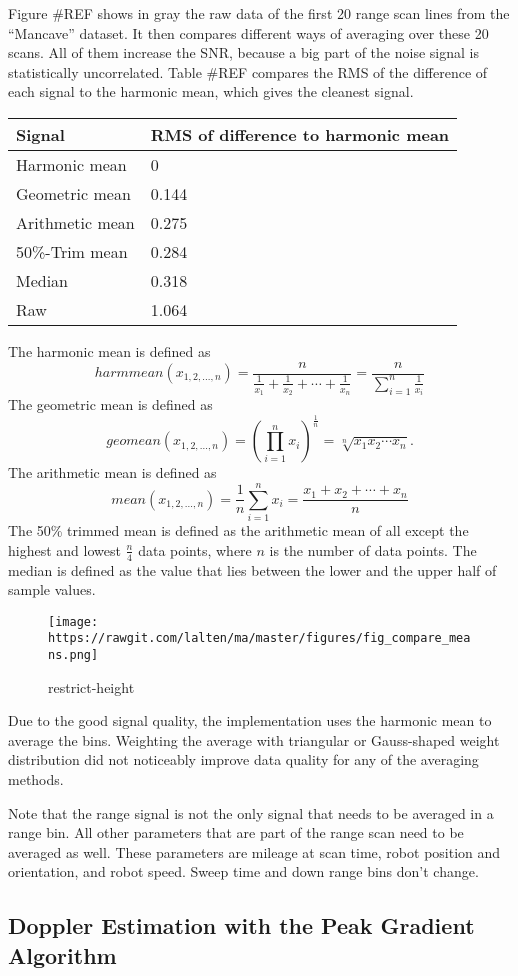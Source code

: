 Figure \#REF shows in gray the raw data of the first 20 range scan lines
from the ``Mancave'' dataset. It then compares different ways of
averaging over these 20 scans. All of them increase the SNR, because a
big part of the noise signal is statistically uncorrelated. Table \#REF
compares the RMS of the difference of each signal to the harmonic mean,
which gives the cleanest signal.

\begin{longtable}[]{@{}ll@{}}
\toprule
Signal & RMS of difference to harmonic mean\tabularnewline
\midrule
\endhead
Harmonic mean & 0\tabularnewline
Geometric mean & 0.144\tabularnewline
Arithmetic mean & 0.275\tabularnewline
50\%-Trim mean & 0.284\tabularnewline
Median & 0.318\tabularnewline
Raw & 1.064\tabularnewline
\bottomrule
\end{longtable}

The harmonic mean is defined as
\[harmmean(x_{1,2,...,n}) = \frac{n}{\frac1{x_1} + \frac1{x_2} + \cdots + \frac1{x_n}} = \frac{n}{\sum\limits_{i=1}^n \frac1{x_i}}\]
The geometric mean is defined as
\[geomean(x_{1,2,...,n}) = \left(\prod_{i=1}^n x_i \right)^\frac{1}{n} = \sqrt[n]{x_1 x_2 \cdots x_n}.\]
The arithmetic mean is defined as
\[mean(x_{1,2,...,n}) = \frac{1}{n}\sum_{i=1}^n x_i=\frac{x_1+x_2+\cdots+x_n}{n}\]
The 50\% trimmed mean is defined as the arithmetic mean of all except
the highest and lowest \(\frac{n}4\) data points, where \(n\) is the
number of data points. The median is defined as the value that lies
between the lower and the upper half of sample values.

\begin{figure}
\centering
\texttt{[image: https://rawgit.com/lalten/ma/master/figures/fig\_compare\_means.png]}
\caption{restrict-height}
\end{figure}

Due to the good signal quality, the implementation uses the harmonic
mean to average the bins. Weighting the average with triangular or
Gauss-shaped weight distribution did not noticeably improve data quality
for any of the averaging methods.

Note that the range signal is not the only signal that needs to be
averaged in a range bin. All other parameters that are part of the range
scan need to be averaged as well. These parameters are mileage at scan
time, robot position and orientation, and robot speed. Sweep time and
down range bins don't change.

\subsection{Doppler Estimation with the Peak Gradient
Algorithm}\label{doppler-estimation-with-the-peak-gradient-algorithm}

